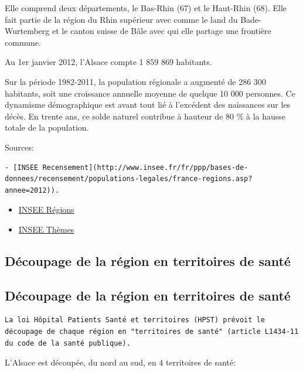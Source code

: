 \documentclass[]{article}
\begin{document}
Elle comprend deux départements, le Bas-Rhin (67) et le Haut-Rhin (68).
Elle fait partie de la région du Rhin supérieur avec comme le land du
Bade-Wurtemberg et le canton suisse de Bâle avec qui elle partage une
frontière commune.

Au 1er janvier 2012, l'Alsace compte 1 859 869 habitants.

Sur la période 1982-2011, la population régionale a augmenté de 286 300
habitants, soit une croissance annuelle moyenne de quelque 10 000
personnes. Ce dynamisme démographique est avant tout lié à l'excédent
des naissances sur les décès. En trente ans, ce solde naturel contribue
à hauteur de 80 \% à la hausse totale de la population.

Sources:

\begin{verbatim}
- [INSEE Recensement](http://www.insee.fr/fr/ppp/bases-de-donnees/recensement/populations-legales/france-regions.asp?annee=2012)).
\end{verbatim}

\begin{itemize}
\itemsep1pt\parskip0pt
\item
  \href{http://www.insee.fr/fr/regions/alsace/default.asp?page=faitsetchiffres/presentation/presentation.htm}{INSEE
  Régions}
\item
  \href{http://www.insee.fr/fr/themes/document.asp?ref_id=20665}{INSEE
  Thèmes}
\end{itemize}

\subsection{Découpage de la région en territoires de
santé}\label{decoupage-de-la-region-en-territoires-de-sante}

\subsection{Découpage de la région en territoires de
santé}\label{decoupage-de-la-region-en-territoires-de-sante-1}

\begin{verbatim}
La loi Hôpital Patients Santé et territoires (HPST) prévoit le découpage de chaque région en "territoires de santé" (article L1434-11 du code de la santé publique).
\end{verbatim}

L'Alsace est découpée, du nord au sud, en 4 territoires de santé:
\end{document}
